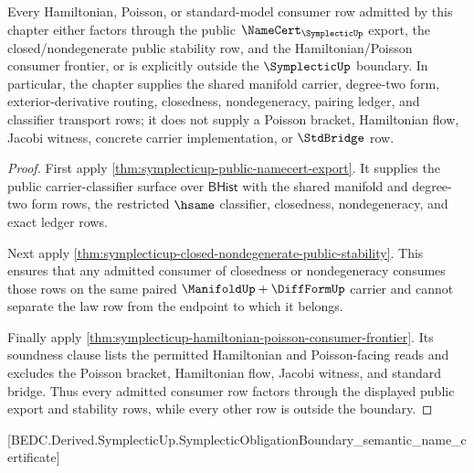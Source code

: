 \begin{theorem}
\label{thm:symplecticup-mature-consumer-completeness-boundary}
Every Hamiltonian, Poisson, or standard-model consumer row admitted by this
chapter either factors through the public $\NameCert_{\SymplecticUp}$ export,
the closed/nondegenerate public stability row, and the Hamiltonian/Poisson
consumer frontier, or is explicitly outside the $\SymplecticUp$ boundary. In
particular, the chapter supplies the shared manifold carrier, degree-two form,
exterior-derivative routing, closedness, nondegeneracy, pairing ledger, and
classifier transport rows; it does not supply a Poisson bracket, Hamiltonian
flow, Jacobi witness, concrete carrier implementation, or $\StdBridge$ row.
\end{theorem}
\begin{proof}
First apply \autoref{thm:symplecticup-public-namecert-export}. It supplies the
public carrier-classifier surface over $\mathsf{BHist}$ with the shared
manifold and degree-two form rows, the restricted $\hsame$ classifier,
closedness, nondegeneracy, and exact ledger rows.

Next apply
\autoref{thm:symplecticup-closed-nondegenerate-public-stability}. This ensures
that any admitted consumer of closedness or nondegeneracy consumes those rows
on the same paired $\ManifoldUp+\DiffFormUp$ carrier and cannot separate the
law row from the endpoint to which it belongs.

Finally apply
\autoref{thm:symplecticup-hamiltonian-poisson-consumer-frontier}. Its soundness
clause lists the permitted Hamiltonian and Poisson-facing reads and excludes
the Poisson bracket, Hamiltonian flow, Jacobi witness, and standard bridge.
Thus every admitted consumer row factors through the displayed public export
and stability rows, while every other row is outside the boundary.
\end{proof}

[BEDC.Derived.SymplecticUp.SymplecticObligationBoundary\_semantic\_name\_certificate]

